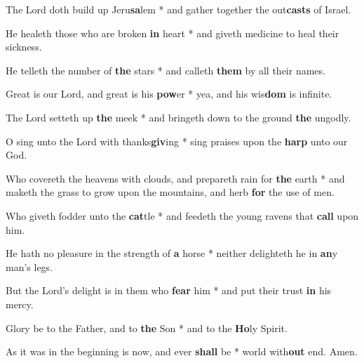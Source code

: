 \begin{multicols}{2}
	The Lord doth build up Jeru\textbf{sa}lem * and gather together the out\textbf{casts} of Israel.
	
	He healeth those who are broken \textbf{in} heart * and giveth medicine to heal their sickness.
	
	He telleth the number of \textbf{the} stars * and calleth \textbf{them} by all their names.
	
	Great is our Lord, and great is his \textbf{pow}er * yea, and his wis\textbf{dom} is infinite.
	
	The Lord setteth up \textbf{the} meek * and bringeth down to the ground \textbf{the} ungodly.
	
	O sing unto the Lord with thanks\textbf{giv}ing * sing praises upon the \textbf{harp} unto our God.
	
	Who covereth the heavens with clouds, and prepareth rain for \textbf{the} earth * and maketh the grass to grow upon the mountains, and herb \textbf{for} the use of men.
	
	Who giveth fodder unto the \textbf{cat}tle * and feedeth the young ravens that \textbf{call} upon him.
	
	He hath no pleasure in the strength of \textbf{a} horse * neither delighteth he in \textbf{an}y man's legs.
	
	But the Lord's delight is in them who \textbf{fear} him * and put their trust \textbf{in} his mercy.
	
	Glory be to the Father, and to \textbf{the} Son * and to the \textbf{Ho}ly Spirit.
	
	As it was in the beginning is now, and ever \textbf{shall} be * world with\textbf{out} end. Amen.
\end{multicols}